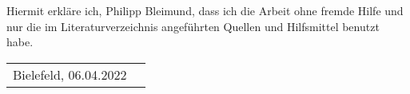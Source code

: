 Hiermit erkläre ich, Philipp Bleimund, dass ich die Arbeit ohne fremde Hilfe und nur die im Literaturverzeichnis angeführten Quellen und Hilfsmittel benutzt habe.
\bigskip
\newline
\begin{tabular}{l r}\hline
    Bielefeld, 06.04.2022\\
\end{tabular}